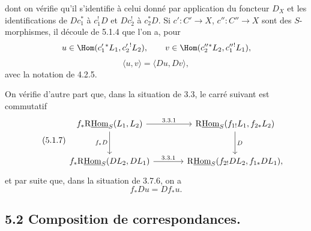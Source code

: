 dont on vérifie qu'il s'identifie à celui donné par application du foncteur $D_X$ et 
les
identifications de $Dc_1^*$ à $c_1^!D$ et $Dc_2^!$ à $c_2^*D$. Si $c':C'\to X$, $c'':C''\to X$ sont des $S$-morphismes, il découle de 5.1.4 que l'on a, pour
\[
u\in\Hom(c_1'{}^*L_1,c_2'{}^!L_2),\qquad v\in\Hom(c_2''{}^*L_2,c_1''{}^!L_1),\]
\begin{equation}
\tag{5.1.6}
\langle u,v\rangle=\langle Du,Dv\rangle,
\end{equation}
avec la notation de 4.2.5.

On vérifie d'autre part que, dans la situation de 3.3, le carré suivant est commutatif
\begin{equation}
\tag{5.1.7}
\begin{tikzcd}[column sep=large,row sep=large]
f_*\mathrm{R}\underline{\mathrm{Hom}}_S(L_1,L_2) \arrow[r,"3.3.1"] \arrow[d,"f_*D"']
& \mathrm{R}\underline{\mathrm{Hom}}_S(f_{1!}L_1,f_{2*}L_2) \arrow[d,"D"] \\
f_*\mathrm{R}\underline{\mathrm{Hom}}_S(DL_2,DL_1) \arrow[r,"3.3.1"]
& \mathrm{R}\underline{\mathrm{Hom}}_S(f_{2!}DL_2,f_{1*}DL_1),
\end{tikzcd}
\end{equation}
et par suite que, dans la situation de 3.7.6, on a
\begin{equation}
\tag{5.1.8}
f_*Du=Df_*u.
\end{equation}

\subsection*{5.2 Composition de correspondances.}

